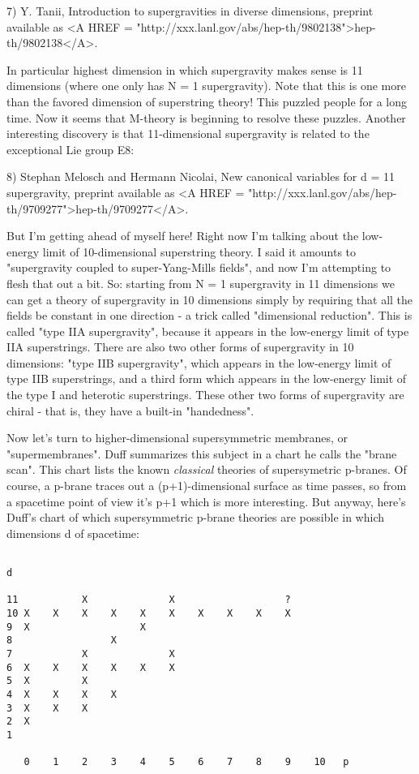 7) Y. Tanii, Introduction to supergravities in diverse dimensions, preprint
available as <A HREF = "http://xxx.lanl.gov/abs/hep-th/9802138">hep-th/9802138</A>.

In particular highest dimension in which supergravity makes sense is 11
dimensions (where one only has N = 1 supergravity).  Note that this is
one more than the favored dimension of superstring theory!  This puzzled
people for a long time.  Now it seems that M-theory is beginning to
resolve these puzzles.  Another interesting discovery is that
11-dimensional supergravity is related to the exceptional Lie group E8:

8) Stephan Melosch and Hermann Nicolai, New canonical variables for 
d = 11 supergravity, preprint available as <A HREF = "http://xxx.lanl.gov/abs/hep-th/9709277">hep-th/9709277</A>.

But I'm getting ahead of myself here!  Right now I'm talking about the
low-energy limit of 10-dimensional superstring theory.  I said it
amounts to "supergravity coupled to super-Yang-Mills fields", and now
I'm attempting to flesh that out a bit.  So: starting from N = 1
supergravity in 11 dimensions we can get a theory of supergravity in 10
dimensions simply by requiring that all the fields be constant in one
direction - a trick called "dimensional reduction".  This is called
"type IIA supergravity", because it appears in the low-energy limit of
type IIA superstrings.  There are also two other forms of supergravity
in 10 dimensions: "type IIB supergravity", which appears in the
low-energy limit of type IIB superstrings, and a third form which
appears in the low-energy limit of the type I and heterotic
superstrings.  These other two forms of supergravity are chiral - that
is, they have a built-in "handedness".

Now let's turn to higher-dimensional supersymmetric membranes, or
"supermembranes".  Duff summarizes this subject in a chart he
calls the "brane scan".  This chart lists the known
\emph{classical} theories of supersymetric p-branes.  Of course, a p-brane
traces out a (p+1)-dimensional surface as time passes, so from a
spacetime point of view it's p+1 which is more interesting.  But anyway,
here's Duff's chart of which supersymmetric p-brane theories are
possible in which dimensions d of spacetime:


\begin{verbatim}

d

11           X              X                   ?
10 X    X    X    X    X    X    X    X    X    X    
9  X                   X
8                 X
7            X              X
6  X    X    X    X    X    X
5  X         X
4  X    X    X    X
3  X    X    X    
2  X
1

   0    1    2    3    4    5    6    7    8    9    10   p
  
\end{verbatim}
    
